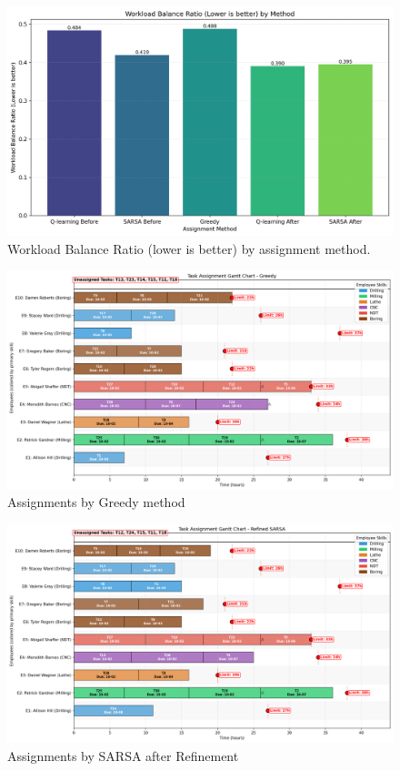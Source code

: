 \documentclass[%
aip,
cp,  %
amsmath,amssymb,
reprint,%
]{revtex4-2}
\begin{document}
	\begin{figure}[H]
		\centering
		\includegraphics[width=1\textwidth]{figures/workload_balance_ratio_comparison.png}
		\caption{\label{fig:workload_balance_ratio}Workload Balance Ratio (lower is better) by assignment method.}
	\end{figure}
	
	\begin{figure}[H]
		\centering
		\includegraphics[width=1\textwidth]{figures/gantt_greedy.png}
		\caption{\label{fig:greedy}Assignments by Greedy method}
	\end{figure}
	
	\begin{figure}[H]
		\centering
		\includegraphics[width=1\textwidth]{figures/gantt_sarsa_after.png}
		\caption{\label{fig:sarsa}Assignments by SARSA after Refinement}
	\end{figure}
	
\end{document}
